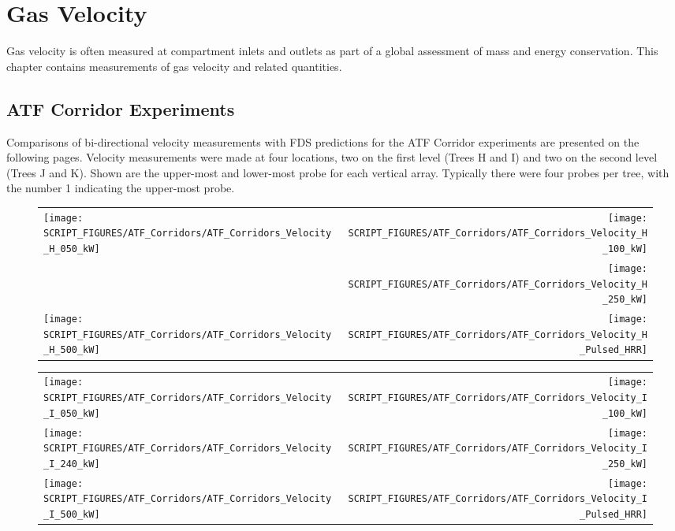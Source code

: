 
\chapter{Gas Velocity}

Gas velocity is often measured at compartment inlets and outlets as part of a global assessment of mass and
energy conservation.  This chapter contains measurements of gas velocity and related quantities.

\section{ATF Corridor Experiments}

Comparisons of bi-directional velocity measurements with FDS predictions for the ATF Corridor experiments are presented on the following
pages. Velocity measurements were made at four locations, two on the first level (Trees H and I) and two on the second level (Trees J and K).
Shown are the upper-most and lower-most probe for each vertical array. Typically there were four probes per tree, with the number 1 indicating the
upper-most probe.

\newpage

\begin{figure}[p]
\begin{tabular*}{\textwidth}{l@{\extracolsep{\fill}}r}
\texttt{[image: SCRIPT\_FIGURES/ATF\_Corridors/ATF\_Corridors\_Velocity\_H\_050\_kW]} &
\texttt{[image: SCRIPT\_FIGURES/ATF\_Corridors/ATF\_Corridors\_Velocity\_H\_100\_kW]} \\
 &
\texttt{[image: SCRIPT\_FIGURES/ATF\_Corridors/ATF\_Corridors\_Velocity\_H\_250\_kW]} \\
\texttt{[image: SCRIPT\_FIGURES/ATF\_Corridors/ATF\_Corridors\_Velocity\_H\_500\_kW]} &
\texttt{[image: SCRIPT\_FIGURES/ATF\_Corridors/ATF\_Corridors\_Velocity\_H\_Pulsed\_HRR]}
\end{tabular*}
\label{ATF_Velocity_H}
\end{figure}

\begin{figure}[p]
\begin{tabular*}{\textwidth}{l@{\extracolsep{\fill}}r}
\texttt{[image: SCRIPT\_FIGURES/ATF\_Corridors/ATF\_Corridors\_Velocity\_I\_050\_kW]} &
\texttt{[image: SCRIPT\_FIGURES/ATF\_Corridors/ATF\_Corridors\_Velocity\_I\_100\_kW]} \\
\texttt{[image: SCRIPT\_FIGURES/ATF\_Corridors/ATF\_Corridors\_Velocity\_I\_240\_kW]} &
\texttt{[image: SCRIPT\_FIGURES/ATF\_Corridors/ATF\_Corridors\_Velocity\_I\_250\_kW]} \\
\texttt{[image: SCRIPT\_FIGURES/ATF\_Corridors/ATF\_Corridors\_Velocity\_I\_500\_kW]} &
\texttt{[image: SCRIPT\_FIGURES/ATF\_Corridors/ATF\_Corridors\_Velocity\_I\_Pulsed\_HRR]}
\end{tabular*}
\label{ATF_Velocity_I}
\end{figure}

